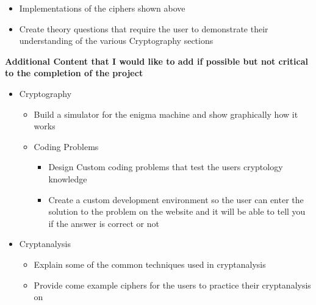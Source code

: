 \begin{itemize}
{\begin{itemize}
{\begin{itemize}
{\begin{itemize}
\item{Electronic Codebook Mode (ECB)}
\item{Cipher Block Chaining (CBC)}
\item{Output Feedback Mode (OFB)}
\item{Cipher Feedback Mode (CFB)}
\item{Counter Mode (CTR)}
\item{Galois Counter Mode (GCM)}
\end{itemize}}
\item{Stream Ciphers
\begin{itemize}
\item{Stream ciphers based off Linear Feedback Shift Register (LFSR)}
\end{itemize}}
\item{Hashing Functions
\begin{itemize}
\item{MD5}
\item{SHA-1}
\item{SHA-2}
\item{SHA-3}
\end{itemize}}
\end{itemize}}
\item{Implementations of the ciphers shown above}
\item{Create theory questions that require the user to demonstrate their understanding of the various Cryptography sections}
\end{itemize}}
\end{itemize}
{\noindent
\textbf{Additional Content that I would like to add if possible but not critical to the completion of the project}}

\begin{itemize} %
\item{Cryptography
\begin{itemize}
\item{Build a simulator for the enigma machine and show graphically how it works}
\item{Coding Problems
\begin{itemize}
\item{Design Custom coding problems that test the users cryptology knowledge}
\item{Create a custom development environment so the user can enter the solution to the problem on the website and it will be able to tell you if the answer is correct or not}
\end{itemize}}
\end{itemize}}
\item{Cryptanalysis
\begin{itemize}
\item{Explain some of the common techniques used in cryptanalysis}
\item{Provide come example ciphers for the users to practice their cryptanalysis on}
\end{itemize}}
\end{itemize}

